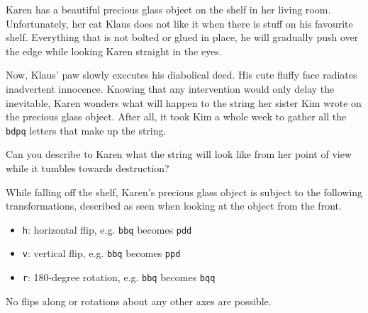 

%
Karen has a beautiful precious glass object on the shelf in her living room.
Unfortunately, her cat Klaus does not like it when there is stuff on his favourite shelf.
Everything that is not bolted or glued in place, he will gradually push over the edge while looking Karen straight in the eyes.

Now, Klaus' paw slowly executes his diabolical deed. 
His cute fluffy face radiates inadvertent innocence.
Knowing that any intervention would only delay the inevitable, Karen wonders what will happen to the string her sister Kim wrote on the precious glass object.
After all, it took Kim a whole week to gather all the \texttt{bdpq} letters that make up the string.

Can you describe to Karen what the string will look like from her point of view while it tumbles towards destruction?

While falling off the shelf, Karen's precious glass object is subject to the following transformations, described as seen when looking at the object from the front.

\begin{itemize}
  \item \texttt{h}: horizontal flip, e.g. \texttt{bbq} becomes \texttt{pdd}
  \item \texttt{v}: vertical flip, e.g. \texttt{bbq} becomes \texttt{ppd}
  \item \texttt{r}: 180-degree rotation, e.g. \texttt{bbq} becomes \texttt{bqq}
\end{itemize}

No flips along or rotations about any other axes are possible.

